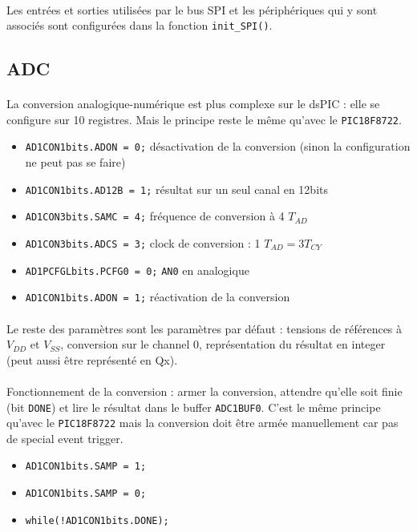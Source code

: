 \documentclass{article}
\begin{document}
    \paragraph{}
    Les entrées et sorties utilisées par le bus SPI et les périphériques qui y sont associés sont configurées dans la fonction \texttt{init\_SPI()}.


    \subsection{ADC}
    \paragraph{}
    La conversion analogique-numérique est plus complexe sur le dsPIC : elle se configure sur 10 registres. Mais le principe reste le même qu'avec le \texttt{PIC18F8722}.
    \begin{itemize}
        \item \texttt{AD1CON1bits.ADON = 0;} désactivation de la conversion (sinon la configuration ne peut pas se faire)
        \item \texttt{AD1CON1bits.AD12B = 1;} résultat sur un seul canal en 12bits
        \item \texttt{AD1CON3bits.SAMC = 4;} fréquence de conversion à 4 $T_{AD}$
        \item \texttt{AD1CON3bits.ADCS = 3;} clock de conversion : 1 $T_{AD} = 3 T_{CY}$
        \item \texttt{AD1PCFGLbits.PCFG0 = 0;} \texttt{AN0} en analogique
        \item \texttt{AD1CON1bits.ADON = 1;} réactivation de la conversion
    \end{itemize}

    \paragraph{}
    Le reste des paramètres sont les paramètres par défaut : tensions de références à $V_{DD}$ et $V_{SS}$, conversion sur le channel 0, représentation du résultat en integer (peut aussi être représenté en Qx).

    \paragraph{}
    Fonctionnement de la conversion : armer la conversion, attendre qu'elle soit finie (bit \texttt{DONE}) et lire le résultat dans le buffer \texttt{ADC1BUF0}. C'est le même principe qu'avec le \texttt{PIC18F8722} mais la conversion doit être armée manuellement car pas de special event trigger.
    \begin{itemize}
        \item \texttt{AD1CON1bits.SAMP = 1;}
        \item \texttt{AD1CON1bits.SAMP = 0;}
        \item \texttt{while(!AD1CON1bits.DONE);}
    \end{itemize}
\end{document}
